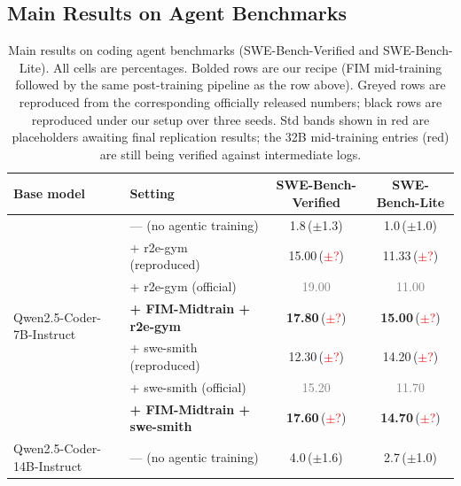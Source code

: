\subsection{Main Results on Agent Benchmarks}
\label{sec:exp:main}

\begin{table}[t]
\centering
\caption{Main results on coding agent benchmarks (SWE-Bench-Verified and
SWE-Bench-Lite). All cells are percentages. Bolded rows are our recipe
(FIM mid-training followed by the same post-training pipeline as the row
above). Greyed rows are reproduced from the corresponding officially
released numbers; black rows are reproduced under our setup over three
seeds. Std bands shown in red are placeholders awaiting final replication
results; the 32B mid-training entries (red) are still being verified
against intermediate logs.}
\label{tab:main}
\small
\setlength{\tabcolsep}{6pt}
\begin{tabular}{llcc}
\toprule
Base model & Setting & SWE-Bench-Verified & SWE-Bench-Lite \\
\midrule
\multirow{7}{*}{Qwen2.5-Coder-7B-Instruct}
  & --- (no agentic training)            & 1.8\,($\pm$1.3)                              & 1.0\,($\pm$1.0) \\
  & + r2e-gym (reproduced)               & 15.00\,(\textcolor{red}{$\pm$?})              & 11.33\,(\textcolor{red}{$\pm$?}) \\
  & + r2e-gym (official)                 & \textcolor{gray}{19.00}                        & \textcolor{gray}{11.00} \\
  & \textbf{+ FIM-Midtrain + r2e-gym}    & \textbf{17.80}\,(\textcolor{red}{$\pm$?})     & \textbf{15.00}\,(\textcolor{red}{$\pm$?}) \\
\cmidrule(lr){2-4}
  & + swe-smith (reproduced)             & 12.30\,(\textcolor{red}{$\pm$?})              & 14.20\,(\textcolor{red}{$\pm$?}) \\
  & + swe-smith (official)               & \textcolor{gray}{15.20}                        & \textcolor{gray}{11.70} \\
  & \textbf{+ FIM-Midtrain + swe-smith}  & \textbf{17.60}\,(\textcolor{red}{$\pm$?})     & \textbf{14.70}\,(\textcolor{red}{$\pm$?}) \\
\midrule
\multirow{4}{*}{Qwen2.5-Coder-14B-Instruct}
  & --- (no agentic training)            & 4.0\,($\pm$1.6)                              & 2.7\,($\pm$1.0) \\

\end{tabular}
\end{table}
